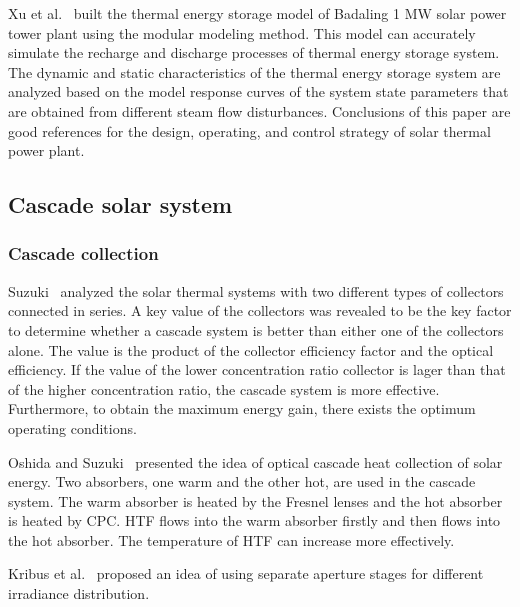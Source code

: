 Xu et al.~\cite{Xu2012} built the thermal energy storage model of Badaling 1 MW solar power tower plant using the modular modeling method. This model can accurately simulate the recharge and discharge processes of thermal energy storage system. The dynamic and static characteristics of the thermal energy storage system are analyzed based on the model response curves of the system state parameters that are obtained from different steam flow disturbances. Conclusions of this paper are good references for the design, operating, and control strategy of solar thermal power plant.

\subsection{Cascade solar system}\label{sec:cs}
\subsubsection{Cascade collection}

Suzuki~\cite{Suzuki1986} analyzed the solar thermal systems with two different types of collectors connected in series. A key value of the collectors was revealed to be the key factor to determine whether a cascade system is better than either one of the collectors alone. The value is the product of the collector efficiency factor and the optical efficiency. If the value of the lower concentration ratio collector is lager than that of the higher concentration ratio, the cascade system is more effective. Furthermore, to obtain the maximum energy gain, there exists the optimum operating conditions.

Oshida and Suzuki~\cite{Oshida1987} presented the idea of optical cascade heat collection of solar energy. Two absorbers, one warm and the other hot, are used in the cascade system. The warm absorber is heated by the Fresnel lenses and the hot absorber is heated by CPC. HTF flows into the warm absorber firstly and then flows into the hot absorber. The temperature of HTF can increase more effectively. 

Kribus et al.~\cite{Kribus1999} proposed an idea of using separate aperture stages for different irradiance distribution.

